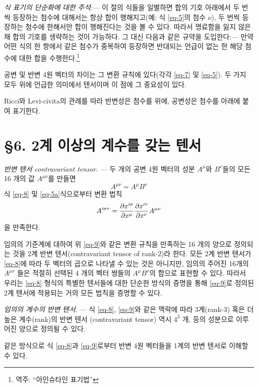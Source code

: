 \documentclass[b5paper]{article}
\begin{document}
\emph{식 표기의 단순화에 대한 주석}:--- 
이 절의 식들을 일별하면 합의 기호 아래에서 두 번씩 등장하는 첨수에 대해서는 항상 합이 행해지고(예: 식 \eqref{eq-5}의 첨수 $\nu$), 두 번씩 등장하는 첨수에 한해서만 합이 행해진다는 것을 볼 수 있다. 따라서 명료함을 잃지 않은 채 합의 기호를 생략하는 것이 가능하다. 그 대신 다음과 같은 규약을 도입한다:--- 만약 어떤 식의 한 항에서 같은 첨수가 중복하여 등장하면 반대되는 언급이 없는 한 해당 첨수에 대한 합을 수행한다.\footnote{역주: ``아인슈타인 표기법''}\par
공변 및 반변 4원 벡터의 차이는 그 변환 규칙에 있다(각각 \eqref{eq-7} 및 \eqref{eq-5}). 두 가지 모두 위에 언급한 의미에서 텐서이며 이 점에 그 중요성이 있다.\par
Ricci와 Levi-civita의 관례를 따라 반변성은 첨수를 위에, 공변성은 첨수를 아래에 붙여 표기한다.

\section*{\S 6. 2계 이상의 계수를 갖는 텐서}
\emph{반변 텐서 contravariant tensor}. --- 
두 개의 공변 4원 벡터의 성분 $A^\mu$와 $B^\nu$들의 모든 16 개의 값 $A^{\mu\nu}$를 만들면
\begin{equation} \label{eq-8}
	A^{\mu\nu} = A^\mu B^\nu
\end{equation}
식 \eqref{eq-8} 및 \eqref{eq-5a}식으로부터 변환 법칙
\begin{equation} \label{eq-9}
	A^{\prime\sigma\tau} = {\frac{{\partial}{x^{\prime\sigma}}}{{\partial}{x^\mu}}} {\frac{{\partial}{x^{\prime\tau}}}{{\partial}{x^\nu}}} A^{\mu\nu}
\end{equation}
을 만족한다. 

임의의 기준계에 대하여 위 \eqref{eq-9}와 같은 변환 규칙을 만족하는 16 개의 양으로 정의되는 것을 2계 반변 텐서(contravariant tensor of rank-2)라 한다. 모든 2계 반변 텐서가 \eqref{eq-8}에 따라 두 벡터의 곱으로 나타낼 수 있는 것은 아니지만, 임의의 주어진 16개의 $A^{\mu\nu}$ 들은 적절히 선택된 4 개의 벡터 쌍들의 $A^{\mu} B^{\nu}$의 합으로 표현할 수 있다.
따라서 우리는 \eqref{eq-8} 형식의 특별한 텐서들에 대한 단순한 방식의 증명을 통해 \eqref{eq-9}로 정의된 2계 텐서에 적용되는 거의 모든 법칙을 증명할 수 있다.

\emph{임의의 계수의 반변 텐서}. --- 
식 \eqref{eq-8}, \eqref{eq-9}와 같은 맥락에 따라 3계(rank-3) 혹은 더 높은 계수(rank)의 반변 텐서 (contravariant tensor) 역시  $4^3$ 개, 등의 성분으로 이루어진 양으로 정의될 수 있다.\par
같은 방식으로 식 \eqref{eq-8}과 \eqref{eq-9}로부터 반변 4원 벡터들을 1계의 반변 텐서로 이해할 수 있다.
\end{document}
